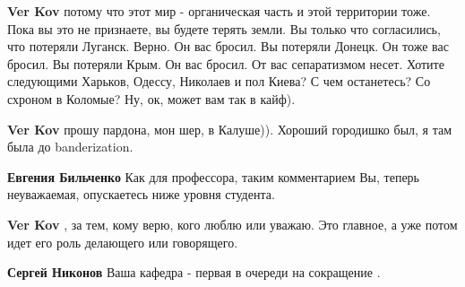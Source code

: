 \begin{itemize}
\begin{itemize}
 
\textbf{Ver Kov} потому что этот мир - органическая часть и этой территории
тоже. Пока вы это не признаете, вы будете терять земли. Вы только что
согласились, что потеряли Луганск. Верно. Он вас бросил. Вы потеряли Донецк. Он
тоже вас бросил. Вы потеряли Крым. Он вас бросил. От вас сепаратизмом несет.
Хотите следующими Харьков, Одессу, Николаев и пол Киева? С чем останетесь? Со
схроном в Коломые? Ну, ок, может вам так в кайф).

 
\textbf{Ver Kov} прошу пардона, мон шер, в Калуше)). Хороший городишко был, я там была до banderization.

 
\textbf{Евгения Бильченко} Как для профессора, таким комментарием Вы, теперь неуважаемая, опускаетесь ниже уровня студента.

 
\textbf{Ver Kov} , за тем, кому верю, кого люблю или уважаю. Это главное, а уже потом идет его роль делающего или говорящего.

 
\textbf{Сергей Никонов} Ваша кафедра - первая в очереди на сокращение .

 

\end{itemize}
\end{itemize}
